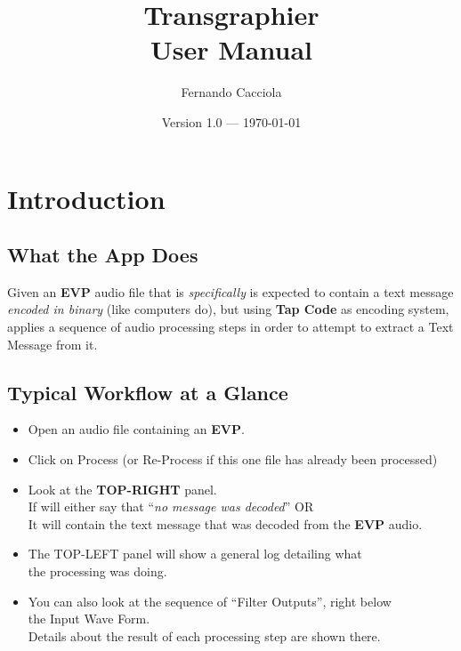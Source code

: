 \documentclass[11pt]{report}
\title{Transgraphier\\{\large User Manual}}
\author{Fernando Cacciola}
\date{Version 1.0 --- \today}
\begin{document}
    \maketitle
    \tableofcontents
    
    \chapter{Introduction}
    \section{What the App Does}
       
       Given an \textbf{EVP} audio file that is \textit{specifically} is expected
       to contain a text message \textit{encoded in binary} (like computers do),
       but using \textbf{Tap Code} as encoding system, applies a sequence of audio processing steps in order to attempt to extract a Text Message from it.
       
    \section{Typical Workflow at a Glance}
    
\begin{itemize}
    \item Open an audio file containing an \textbf{EVP}.
         
    \item Click on Process (or Re-Process if this one file has already been processed)
         
    \item Look at the \textbf{TOP-RIGHT} panel.\\
          If will either say that ``\textit{no message was decoded}'' OR\\
          It will contain the text message that was decoded from the \textbf{EVP} audio.
         
    \item The TOP-LEFT panel will show a general log detailing what\\
          the processing was doing.
         
    \item You can also look at the sequence of ``Filter Outputs'', right below\\
           the Input Wave Form.\\
           Details about the result of each processing step are shown there.
\end{itemize}
    
\end{document}
